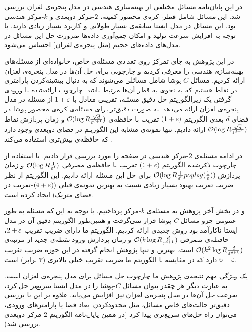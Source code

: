 

در این پایان‌نامه مسائل مختلفی از بهینه‌سازی هندسی در مدل پنجره‌ی لغزان بررسی شد. این مسائل شامل قطر، کره‌ی محصور کمینه، $2$-مرکز دوبعدی و $k$-مرکز هندسی بود. این مسائل در مدل ایستا سابقه‌‌ی بسیار طولانی و کاربرد بسیار زیادی دارند. با توجه به افزایش سرعت تولید و امکان جمع‌آوری داده‌ها ضرورت حل این مسائل در مدل‌های داده‌های حجیم (مثل پنجره‌ی لغزان) احساس می‌شود. 

در این پژوهش به جای تمرکز روی تعدادی مسئله‌ی خاص، خانواده‌ای از مسئله‌های بهینه‌سازی هندسی را معرفی کردیم و چارچوبی برای حل آن‌ها در مدل پنجره‌ی لغزان ارائه کردیم. مسائل $C$-پوشا شامل مسائلی می‌شوند که به دنبال بیشینه‌کردن پارامتری در نقاط هستیم که به نحوی به قطر آن‌ها مرتبط باشد. چارچوب ارائه‌شده با ورودی گرفتن یک زیرالگوریتم حل دقیق مسئله، تقریبی معادل با $1+\varepsilon$ از مسئله در مدل پنجره‌ی لغزان ارائه می‌دهد. به صورت دقیق‌تر برای مسئله‌ی کره‌ی محصور پوشا در فضای $d$-بعدی الگوریتم $(1+\varepsilon)$-تقریب با حافظه‌ی $ \mathcal{O}(\log R \frac{\sqrt{d}}{\varepsilon^{d+1}})$ و زمان پردازش نقاط  $ \mathcal{O}(\log R \frac{\sqrt{d}}{\varepsilon^{d+1}})$ ارائه دادیم. تنها نمونه‌ی مشابه این الگوریتم در فضای دوبعدی وجود دارد که حافظه‌ی بیش‌تری استفاده می‌کند .

در ادامه مسئله‌ی $2$-مرکز هندسی در صفحه را مورد بررسی قرار دادیم. با استفاده از چارچوب ذکرشده الگوریتم $(1+\varepsilon)$-تقریب با حافظه‌ی مصرفی $ \mathcal{O}(\log R \frac{1}{\varepsilon^{3}})$ و زمان پردازش $ \mathcal{O}(\log R \frac{1}{\varepsilon^3} poylog(\frac{1}{\varepsilon}))$ برای حل این مسئله ارائه دادیم. این الگوریتم از نظر ضریب تقریب بهبود بسیار زیادی نسبت به بهترین نمونه‌ی قبلی ($(4+\varepsilon)$-تقریب در فضای متریک) ایجاد کرده است.

و در بخش آخر پژوهش به مسئله‌ی $k$-مرکز پرداختیم. با توجه به این که مسئله به طور عمومی جزو مسائل $C$-پوشا قرار نمی‌گرفت و همین‌طور الگوریتم دقیق آن در مدل ایستا ناکارآمد بود روش جدیدی ارائه کردیم. الگوریتم ما دارای ضریب تقریب $2+\varepsilon$، حافظه‌ی مصرفی $ \mathcal{O}(k \log R \frac{d}{\varepsilon^{d+1}})$ و زمان پردازش ورود نقطه‌ی جدید از مرتبه‌ی $ \mathcal{O}(k^2 \log R \frac{d}{\varepsilon^{d+1}})$ است. بهترین و تنها پژوهش انجام گرفته در این حوزه ضریب تقریب $6+\varepsilon$ دارد که در مقایسه با الگوریتم ما ضریب تقریب خیلی بالاتری (۳ برابر) است. 


یک ویژگی مهم نتیجه‌ی پژوهش ما چارچوب حل مسائل برای مدل پنجره‌ی لغزان است. به عبارت دیگر هر چقدر بتوان مسائل $C$-پوشا را در مدل ایستا سریع‌تر حل کرد، سرعت حل آن‌ها در مدل پنجره‌ی لغزان نیز افزایش می‌یابد. علاوه بر این با بررسی دقیق‌تر حالت‌های خاص مسائل، مثل محدودکردن ابعاد فضا یا پارامترهای ورودی،  می‌توان راه حل‌های سریع‌تری پیدا کرد (در همین پایان‌نامه الگوریتم $2$-مرکز دوبعدی بررسی شد).

